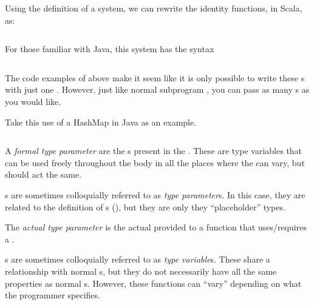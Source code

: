 Using the definition of a  system, we can rewrite the identity functions, in Scala, as:
\inputminted[frame=lines,linenos]{scala}{./EDAP05-Concepts_Programming_Languages-Sections/Advanced_Data_Types/Code/Polymorphism_Identity_Functions.scala}

For those familiar with Java, this  system has the syntax
\inputminted[frame=lines,linenos]{scala}{./EDAP05-Concepts_Programming_Languages-Sections/Advanced_Data_Types/Code/Polymorphism_Identity_Functions.java}

\begin{remark*}
  The code examples of  above make it seem like it is only possible to write these s with just one .
  However, just like normal subprogram , you can pass as many s as you would like.

  Take this use of a HashMap in Java as an example.
  \inputminted[frame=lines,linenos]{scala}{./EDAP05-Concepts_Programming_Languages-Sections/Advanced_Data_Types/Code/Polymorphism_HashMap.java}
\end{remark*}

\begin{definition}\label{def:Formal_Type_Parameter}
  A \emph{formal type parameter} are the s present in the .
  These are type variables that can be used freely throughout the body in all the places where the  can vary, but should act the same.

  \begin{remark}\label{rmk:Type_Parameter}
    s are sometimes colloquially referred to as \emph{type parameter}s.
    In this case, they are related to the definition of s (), but they are only they ``placeholder'' types.
  \end{remark}
\end{definition}

\begin{definition}\label{def:Actual_Type_Parameter}
  The \emph{actual type parameter} is the actual  provided to a function that uses/requires a .
  
  \begin{remark}\label{rmk:Type_Variable}
    s are sometimes colloquially referred to as \emph{type variable}s.
    These share a relationship with normal s, but they do not necessarily have all the same properties as normal s.
    However, these functions can ``vary'' depending on what the programmer specifies.
  \end{remark}
\end{definition}

